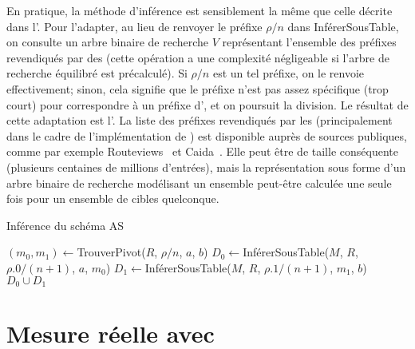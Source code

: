 En pratique, la méthode d'inférence est sensiblement la même que celle décrite
dans l'. Pour l'adapter, au lieu de
renvoyer le préfixe $\rho/n$ dans {\sc InférerSousTable}, on consulte un arbre
binaire de recherche $V$ représentant l'ensemble des préfixes revendiqués par
des \as (cette opération a une complexité négligeable si l'arbre de recherche
équilibré est précalculé).
Si $\rho/n$ est un tel préfixe, on le renvoie effectivement; sinon, cela
signifie que le préfixe n'est pas assez spécifique (trop court) pour
correspondre à un préfixe d'\as, et on poursuit la division. Le résultat de
cette adaptation est l'. La liste des préfixes
revendiqués par les \as (principalement dans le cadre de l'implémentation de
\bgp) est disponible auprès de sources publiques, comme par exemple
Routeviews~\cite{routeviews} et Caida~\cite{caida}. Elle peut être de taille
conséquente (plusieurs centaines de millions d'entrées), mais la représentation
sous forme d'un arbre binaire de recherche modélisant un ensemble peut-être
calculée une seule fois pour un ensemble de cibles quelconque.



\begin{algorithm}
\caption{Inférence du schéma AS}
\label{alg:revtables-inference-as}
\begin{algorithmic}
\EndFunction
{}
\EndFunction
{}
\Else
	\State $(m_0, m_1) \gets ${\sc TrouverPivot}($R$, $\rho/n$, $a$, $b$)
	\State $D_0 \gets ${\sc InférerSousTable}($M$, $R$, $\rho.0/(n+1)$, $a$, $m_0$)
	\State $D_1 \gets ${\sc InférerSousTable}($M$, $R$, $\rho.1/(n+1)$, $m_1$, $b$)
	 $D_0 \cup D_1$
\EndIf
\EndFunction
{}
\EndFunction
\end{algorithmic}
\end{algorithm}

\section{Mesure réelle avec \planetlab}
\label{sec:revtables-measurement}

